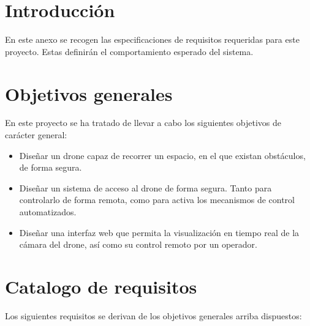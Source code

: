 
\section{Introducción}

En este anexo se recogen las especificaciones de requisitos requeridas para este proyecto. Estas definirán el comportamiento esperado del sistema. 

\section{Objetivos generales}

En este proyecto se ha tratado de llevar a cabo los siguientes objetivos de carácter general: 

\begin{itemize}
\item Diseñar un drone capaz de recorrer un espacio, en el que existan obstáculos, de forma segura.
\item Diseñar un sistema de acceso al drone de forma segura. Tanto para controlarlo de forma remota, como para activa los mecanismos de control automatizados.
\item Diseñar una interfaz web que permita la visualización en tiempo real de la cámara del drone, así como su control remoto por un operador.
\end{itemize}


\section{Catalogo de requisitos}
Los siguientes requisitos se derivan de los objetivos generales arriba dispuestos: 

